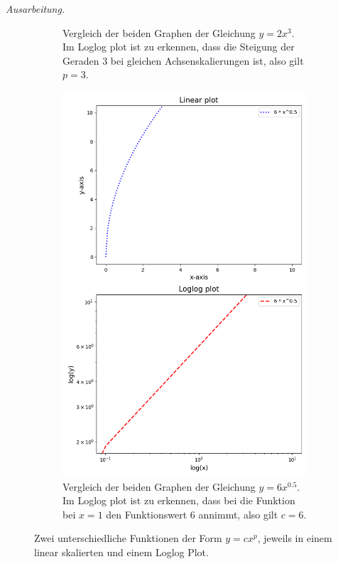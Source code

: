 \documentclass[titlepage]{article}
\newenvironment{ausarbeitung}{\vspace{3mm}\noindent\textit{Ausarbeitung.}}{}
\begin{document}
\begin{ausarbeitung}
\begin{figure}
\begin{subfigure}{0.48\textwidth}
			\caption{Vergleich der beiden Graphen der Gleichung $y = 2x^3$. Im Loglog plot ist zu erkennen, dass die Steigung der Geraden $3$ bei gleichen Achsenskalierungen ist, also gilt $p = 3$.}
			\label{fig:loglog_plot_a}
		\end{subfigure}
		\hfill
		\begin{subfigure}{0.48\textwidth}
			\includegraphics[width=\textwidth]{loglog_plot_b}
			\caption{Vergleich der beiden Graphen der Gleichung $y = 6x^{0.5}$. Im Loglog plot ist zu erkennen, dass bei die Funktion bei $x=1$ den Funktionswert $6$ annimmt, also gilt $c = 6$.}
			\label{fig:loglog_plot_b}
		\end{subfigure}
		
		\caption{Zwei unterschiedliche Funktionen der Form $y = cx^p$, jeweils in einem linear skalierten und einem Loglog Plot.}
		\label{fig:loglog_plot}
	\end{figure}
	
\end{ausarbeitung}
\newpage
\end{document}
